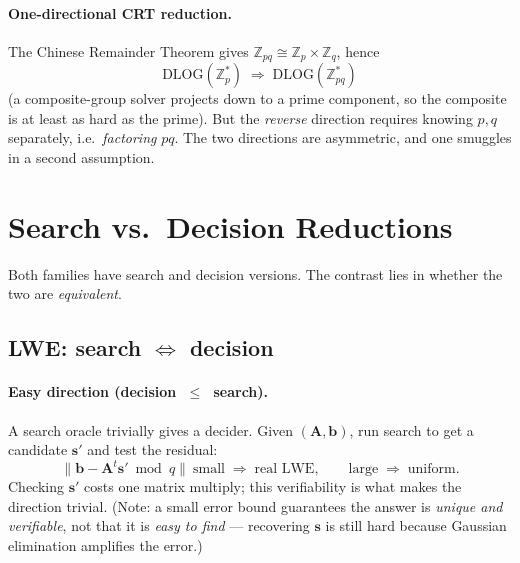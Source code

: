 \documentclass[11pt]{article}
\theoremstyle{definition}
\theoremstyle{plain}
\theoremstyle{remark}
\newcommand{\Z}{\mathbb{Z}}
\newcommand{\vA}{\mathbf{A}}
\newcommand{\vs}{\mathbf{s}}
\newcommand{\vb}{\mathbf{b}}
\newcommand{\dlog}{\mathrm{DLOG}}
\newcommand{\norm}[1]{\lVert #1 \rVert}
\newcommand{\reduces}{\;\leq\;}
\begin{document}
\paragraph{One-directional CRT reduction.}
The Chinese Remainder Theorem gives $\Z_{pq}\cong\Z_p\times\Z_q$, hence
\[
   \dlog(\Z_p^*) \;\Longrightarrow\; \dlog(\Z_{pq}^*)
\]
(a composite-group solver projects down to a prime component, so the composite is at least
as hard as the prime). But the \emph{reverse} direction requires knowing $p,q$ separately,
i.e.\ \emph{factoring} $pq$. The two directions are asymmetric, and one smuggles in a second
assumption.

\section{Search vs.\ Decision Reductions}

Both families have search and decision versions. The contrast lies in whether the two are
\emph{equivalent}.

\subsection{LWE: search \texorpdfstring{$\Longleftrightarrow$}{<=>} decision}

\paragraph{Easy direction (decision \texorpdfstring{$\reduces$}{<=} search).}
A search oracle trivially gives a decider. Given $(\vA,\vb)$, run search to get a candidate
$\vs'$ and test the residual:
\[
   \norm{\vb - \vA^t\vs' \bmod q}\ \text{small} \;\Rightarrow\; \text{real LWE},
   \qquad
   \text{large} \;\Rightarrow\; \text{uniform}.
\]
Checking $\vs'$ costs one matrix multiply; this verifiability is what makes the direction
trivial. (Note: a small error bound guarantees the answer is \emph{unique and verifiable},
not that it is \emph{easy to find} --- recovering $\vs$ is still hard because Gaussian
elimination amplifies the error.)
\end{document}
